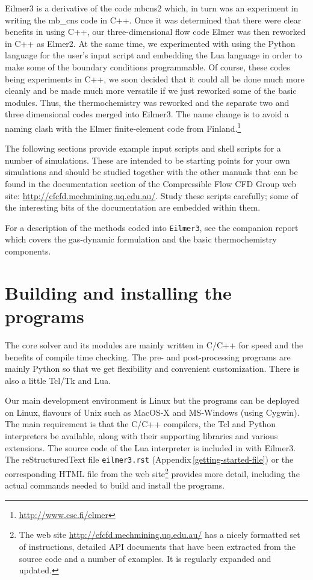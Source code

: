 \documentclass[12pt,a4paper,twoside]{article}
\begin{document}
\medskip
Eilmer3 is a derivative of the code mbcns2 which, in turn was an experiment in writing
the mb\_cns code in C++.
Once it was determined that there were clear benefits in using C++,
our three-dimensional flow code Elmer was then reworked in C++ as Elmer2.
At the same time, we experimented with using the Python language for the user's input script and 
embedding the Lua language in order to make some of the boundary conditions programmable.
Of course, these codes being experiments in C++, we soon decided that it could all be done
much more cleanly and be made much more versatile if we just reworked some of the basic modules.
Thus, the thermochemistry was reworked and the separate two and three dimensional codes merged
into Eilmer3.
The name change is to avoid a naming clash with the Elmer finite-element code 
from Finland.\footnote{\url{http://www.csc.fi/elmer}}

\medskip 
The following sections provide example input scripts and shell scripts for a number of simulations.
These are intended to be starting points for your own simulations and should be studied together with 
the other manuals that can be found in the documentation section of the 
Compressible Flow CFD Group web site:  
\url{http://cfcfd.mechmining.uq.edu.au/}.
Study these scripts carefully; some of the interesting bits of the documentation are
embedded within them.

\medskip
For a description of the methods coded into \texttt{Eilmer3}, see the companion report \cite{jacobs_etal_2010b}
which covers the gas-dynamic formulation and the basic thermochemistry components.

\clearpage
\section{Building and installing the programs}
%
The core solver and its modules are mainly written in C/C++ for speed and the benefits of compile time checking. 
The pre- and post-processing programs are mainly Python so that we get flexibility and convenient customization.
There is also a little Tcl/Tk and Lua.

\medskip
Our main development environment is Linux but the programs can be deployed on
Linux, flavours of Unix such as MacOS-X and MS-Windows (using Cygwin).
The main requirement is that the C/C++ compilers, the Tcl and Python
interpreters be available, along with their supporting libraries and 
various extensions. 
The source code of the Lua interpreter is included in with Eilmer3.
The reStructuredText file \texttt{eilmer3.rst} (Appendix\,\ref{getting-started-file}) 
or the corresponding HTML file from the web site\footnote{The web site 
\url{http://cfcfd.mechmining.uq.edu.au/} has a nicely formatted set of instructions,
detailed API documents that have been extracted from the source code and 
a number of examples.  It is regularly expanded and updated.}
provides more detail, including the actual commands needed to build and install the programs.
\end{document}
